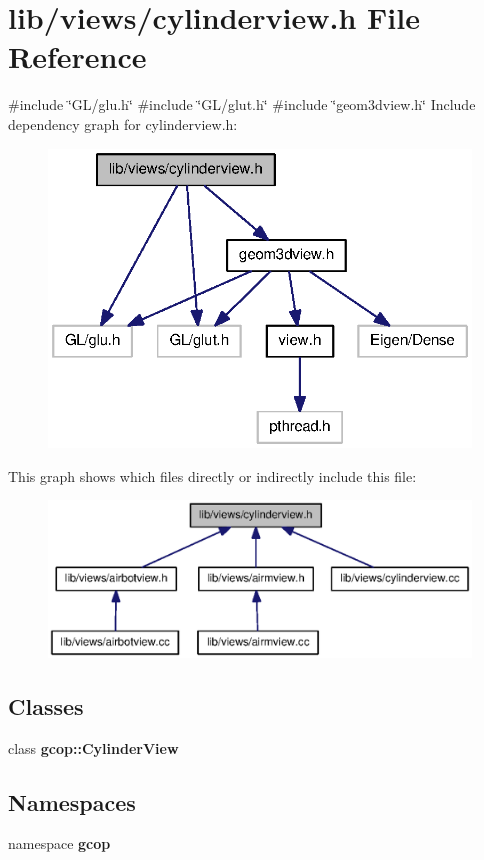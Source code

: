 \section{lib/views/cylinderview.h \-File \-Reference}
\label{cylinderview_8h}
{\ttfamily \#include \char`\"{}\-G\-L/glu.\-h\char`\"{}}\*
{\ttfamily \#include \char`\"{}\-G\-L/glut.\-h\char`\"{}}\*
{\ttfamily \#include \char`\"{}geom3dview.\-h\char`\"{}}\*
\-Include dependency graph for cylinderview.\-h\-:\nopagebreak
\begin{figure}[H]
\begin{center}
\leavevmode
\includegraphics[width=322pt]{cylinderview_8h__incl}
\end{center}
\end{figure}
\-This graph shows which files directly or indirectly include this file\-:\nopagebreak
\begin{figure}[H]
\begin{center}
\leavevmode
\includegraphics[width=350pt]{cylinderview_8h__dep__incl}
\end{center}
\end{figure}
\subsection*{\-Classes}
\begin{DoxyCompactItemize}
\item 
class {\bf gcop\-::\-Cylinder\-View}
\end{DoxyCompactItemize}
\subsection*{\-Namespaces}
\begin{DoxyCompactItemize}
\item 
namespace {\bf gcop}
\end{DoxyCompactItemize}
